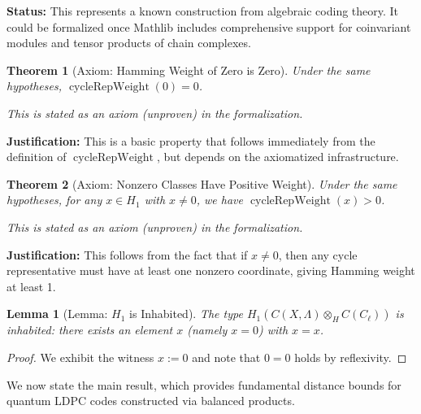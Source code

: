 \documentclass[11pt]{article}
\theoremstyle{plain}
\newtheorem*{theorem}{Theorem}
\newtheorem*{lemma}{Lemma}
\theoremstyle{definition}
\theoremstyle{remark}
\begin{document}
\textbf{Status:} This represents a known construction from algebraic coding theory. It could be formalized once Mathlib includes comprehensive support for coinvariant modules and tensor products of chain complexes.

\begin{theorem}[Axiom: Hamming Weight of Zero is Zero]
Under the same hypotheses, $\operatorname{cycleRepWeight}(0) = 0$.

\textit{This is stated as an axiom (unproven) in the formalization.}
\end{theorem}

\textbf{Justification:} This is a basic property that follows immediately from the definition of $\operatorname{cycleRepWeight}$, but depends on the axiomatized infrastructure.

\begin{theorem}[Axiom: Nonzero Classes Have Positive Weight]
Under the same hypotheses, for any $x \in H_1$ with $x \neq 0$, we have $\operatorname{cycleRepWeight}(x) > 0$.

\textit{This is stated as an axiom (unproven) in the formalization.}
\end{theorem}

\textbf{Justification:} This follows from the fact that if $x \neq 0$, then any cycle representative must have at least one nonzero coordinate, giving Hamming weight at least 1.

\begin{lemma}[Lemma: $H_1$ is Inhabited]
The type $H_1(C(X,\Lambda) \otimes_H C(C_\ell))$ is inhabited: there exists an element $x$ (namely $x = 0$) with $x = x$.
\end{lemma}

\begin{proof}
We exhibit the witness $x := 0$ and note that $0 = 0$ holds by reflexivity.
\end{proof}

We now state the main result, which provides fundamental distance bounds for quantum LDPC codes constructed via balanced products.
\end{document}
